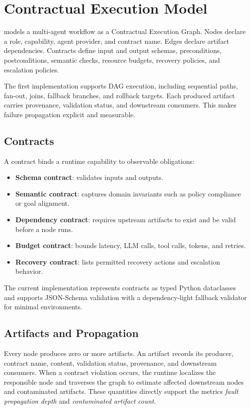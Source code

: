 \section{Contractual Execution Model}
\label{sec:method}

\system models a multi-agent workflow as a Contractual Execution Graph. Nodes declare a role, capability, agent provider, and contract name. Edges declare artifact dependencies. Contracts define input and output schemas, preconditions, postconditions, semantic checks, resource budgets, recovery policies, and escalation policies.

The first implementation supports DAG execution, including sequential paths, fan-out, joins, fallback branches, and rollback targets. Each produced artifact carries provenance, validation status, and downstream consumers. This makes failure propagation explicit and measurable.

\subsection{Contracts}

A contract binds a runtime capability to observable obligations:

\begin{itemize}
    \item \textbf{Schema contract}: validates inputs and outputs.
    \item \textbf{Semantic contract}: captures domain invariants such as policy compliance or goal alignment.
    \item \textbf{Dependency contract}: requires upstream artifacts to exist and be valid before a node runs.
    \item \textbf{Budget contract}: bounds latency, LLM calls, tool calls, tokens, and retries.
    \item \textbf{Recovery contract}: lists permitted recovery actions and escalation behavior.
\end{itemize}

The current implementation represents contracts as typed Python dataclasses and supports JSON-Schema validation with a dependency-light fallback validator for minimal environments.

\subsection{Artifacts and Propagation}

Every node produces zero or more artifacts. An artifact records its producer, contract name, content, validation status, provenance, and downstream consumers. When a contract violation occurs, the runtime localizes the responsible node and traverses the graph to estimate affected downstream nodes and contaminated artifacts. These quantities directly support the metrics \textit{fault propagation depth} and \textit{contaminated artifact count}.

